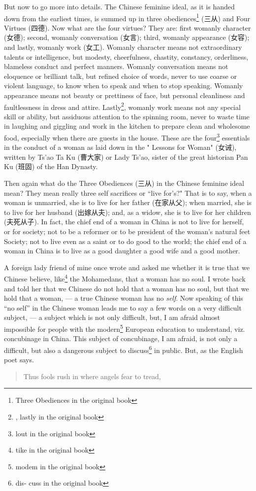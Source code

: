 But now to go more into details.
The Chinese feminine ideal, as it is handed down from the earliest times, is summed up in three obediences\footnote{Three Obediences in the original book} (三从) and Four Virtues (四德). 
Now what are the four virtues?
They are: first womanly character (女德); second, womanly conversation (女言); third, womanly appearance (女容); and lastly, womanly work (女工).
Womanly character means not extraordinary talents or intelligence, but modesty, cheerfulness, chastity, constancy, orderliness, blameless conduct and perfect manners.
Womanly conversation means not eloquence or brilliant talk, but refined choice of words, never to use coarse or violent language, to know when to speak and when to stop speaking.
Womanly appearance means not beauty or prettiness of face, but personal cleanliness and faultlessness in dress and attire.
Lastly\footnote{, lastly in the original book}, womanly work means not any special skill or ability, but assiduous attention to the spinning room, never to waste time in laughing and giggling and work in the kitchen to prepare clean and wholesome food, especially when there are guests in the house.
These are the four\footnote{lout in the original book} essentials in the conduct of a woman as laid down in the " Lessons for Woman" (女诫), written by Ts'ao Ta Ku (曹大家)  or Lady Ts'ao, sister of the great historian Pan Ku (班固) of the Han Dynasty.

Then again what do the Three Obediences (三从) in the Chinese feminine ideal mean?
They mean really three self sacrifices or ``live for's?"
That is to say, when a woman is unmarried, she is to live for her father (在家从父); when married, she is to live for her husband (出嫁从夫); and, as a widow, she is to live for her children (夫死从子).
In fact, the chief end of a woman in China is not to live for herself, or for society; not to be a reformer or to be president of the woman's natural feet Society; not to live even as a saint or to do good to the world; the chief end of a woman in China is to live as a good daughter a good wife and a good mother.

A foreign lady friend of mine once wrote and asked me whether it is true that we Chinese believe, like\footnote{tike in the original book} the Mohamedans, that a woman has no soul.
I wrote back and told her that we Chinese do not hold that a woman has no soul, but that we hold that a woman, --- a true Chinese woman has no \emph{self}.
Now speaking of this ``no self'' in the Chinese woman leads me to say a few words on a very difficult subject, --- a subject which is not only difficult, but, I am afraid almost impossible for people with the modern\footnote{modem in the original book} European education to understand, viz. concubinage in China.
This subject of concubinage, I am afraid, is not only a difficult, but also a dangerous subject to discuss\footnote{dis- cuss in the original book} in public.
But, as the English poet says.
\begin{quote}\footnotesize
     Thus fools rush in where angels fear to tread,
 \end{quote}

